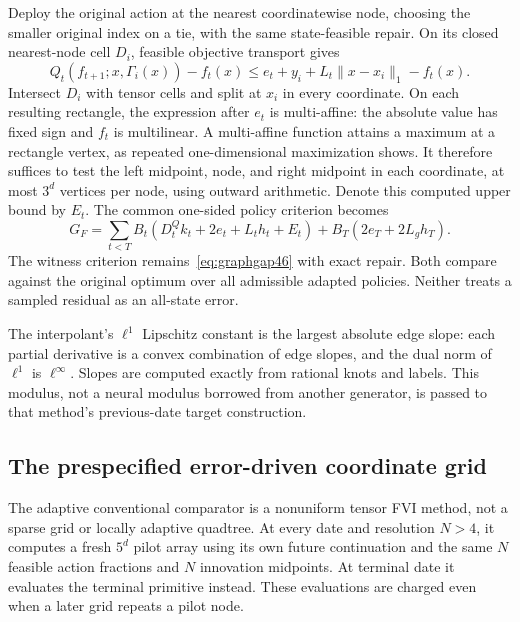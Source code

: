 Deploy the original action at the nearest coordinatewise node, choosing the smaller original index on a tie, with the same state-feasible repair. On its closed nearest-node cell $D_i$, feasible objective transport gives
\[
 Q_t(f_{t+1};x,\Gamma_i(x))-f_t(x)
 \le e_t+y_i+L_t\|x-x_i\|_1-f_t(x).
\]
Intersect $D_i$ with tensor cells and split at $x_i$ in every coordinate. On each resulting rectangle, the expression after $e_t$ is multi-affine: the absolute value has fixed sign and $f_t$ is multilinear. A multi-affine function attains a maximum at a rectangle vertex, as repeated one-dimensional maximization shows. It therefore suffices to test the left midpoint, node, and right midpoint in each coordinate, at most $3^d$ vertices per node, using outward arithmetic. Denote this computed upper bound by $E_t$. The common one-sided policy criterion becomes
\begin{equation}\label{eq:fvi48}
 G_F=\sum_{t<T}B_t(D_t^Qk_t+2e_t+L_th_t+E_t)
        +B_T(2e_T+2L_gh_T).
\end{equation}
The witness criterion remains~\eqref{eq:graphgap46} with exact repair. Both compare against the original optimum over all admissible adapted policies. Neither treats a sampled residual as an all-state error.

The interpolant's $\ell^1$ Lipschitz constant is the largest absolute edge slope: each partial derivative is a convex combination of edge slopes, and the dual norm of $\ell^1$ is $\ell^\infty$. Slopes are computed exactly from rational knots and labels. This modulus, not a neural modulus borrowed from another generator, is passed to that method's previous-date target construction.

\subsection{The prespecified error-driven coordinate grid}
The adaptive conventional comparator is a nonuniform tensor FVI method, not a sparse grid or locally adaptive quadtree. At every date and resolution $N>4$, it computes a fresh $5^d$ pilot array using its own future continuation and the same $N$ feasible action fractions and $N$ innovation midpoints. At terminal date it evaluates the terminal primitive instead. These evaluations are charged even when a later grid repeats a pilot node.

